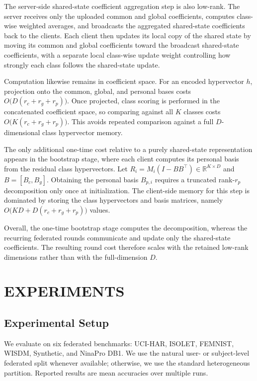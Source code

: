 \documentclass[lettersize,journal]{IEEEtran}
\newcommand{\rev}[1]{#1}
\begin{document}
The server-side \rev{shared-state coefficient} aggregation step is also low-rank.
The server receives only the uploaded common and global coefficients, computes class-wise weighted averages, and broadcasts the aggregated \rev{shared-state coefficients} back to the clients.
Each client then updates its \rev{local copy of the shared state} by moving its common and global coefficients toward the broadcast \rev{shared-state coefficients}, with a separate local class-wise update weight controlling how strongly each class follows the \rev{shared-state update}.

Computation likewise remains in coefficient space.
For an encoded hypervector $h$, projection onto the common, global, and personal bases costs $O\!\bigl(D(r_c+r_g+r_p)\bigr)$.
Once projected, class scoring is performed in the concatenated coefficient space, so comparing against all $K$ classes costs $O\!\bigl(K(r_c+r_g+r_p)\bigr)$.
This avoids repeated comparison against a full $D$-dimensional class hypervector memory.

The only additional one-time cost relative to a purely \rev{shared-state representation} appears in the bootstrap stage, where each client computes its personal basis from the residual class hypervectors.
Let $R_i = M_i(I-BB^\top)\in\mathbb{R}^{K\times D}$ and $B=[B_c,B_g]$.
Obtaining the personal basis $B_{p,i}$ requires a truncated rank-$r_p$ decomposition only once at initialization.
The client-side memory for this step is dominated by storing the class hypervectors and basis matrices, namely $O\!\bigl(KD + D(r_c+r_g+r_p)\bigr)$ values.

Overall, the one-time bootstrap stage computes the decomposition, whereas the recurring federated rounds communicate and update only the \rev{shared-state coefficients}.
The resulting round cost therefore scales with the retained low-rank dimensions rather than with the full-dimension $D$.







\section{EXPERIMENTS}

\subsection{Experimental Setup}

We evaluate on \rev{six} federated benchmarks: UCI-HAR, ISOLET, FEMNIST, WISDM, Synthetic, and NinaPro DB1.
We use the natural user- or subject-level federated split whenever available; otherwise, we use the standard heterogeneous partition.
Reported results are mean accuracies over multiple runs.
\end{document}
